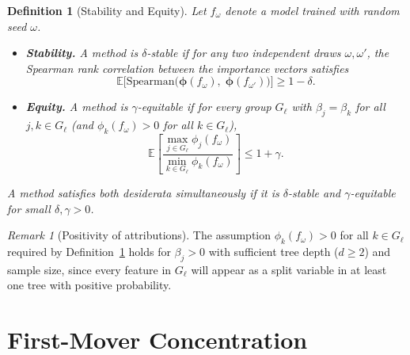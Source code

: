 \documentclass[11pt]{article}
\newtheorem{definition}[theorem]{Definition}
\theoremstyle{remark}
\newtheorem{remark}[theorem]{Remark}
\newcommand{\Gl}{G_\ell}                    %
\newcommand{\phij}{\phi_j}                  %
\newcommand{\phik}{\phi_k}                  %
\newcommand{\Exp}{\mathbb{E}}              %
\begin{document}
\begin{definition}[Stability and Equity]
\label{def:desiderata}
Let $f_\omega$ denote a model trained with random seed $\omega$.
\begin{itemize}
  \item \textbf{Stability.} A method is $\delta$-stable if for any two
    independent draws $\omega, \omega'$, the Spearman rank correlation
    between the importance vectors satisfies
    \begin{equation}
      \Exp\bigl[\mathrm{Spearman}\bigl(
        \boldsymbol{\phi}(f_\omega),\;
        \boldsymbol{\phi}(f_{\omega'})
      \bigr)\bigr] \geq 1 - \delta.
    \end{equation}

  \item \textbf{Equity.} A method is $\gamma$-equitable if for every group
    $\Gl$ with $\beta_j = \beta_k$ for all $j, k \in \Gl$
    (and $\phik(f_\omega) > 0$ for all $k \in \Gl$),
    \begin{equation}
      \Exp\!\left[
        \frac{\max_{j \in \Gl} \phij(f_\omega)}
             {\min_{k \in \Gl} \phik(f_\omega)}
      \right] \leq 1 + \gamma.
    \end{equation}
\end{itemize}
A method satisfies both desiderata simultaneously if it is
$\delta$-stable and $\gamma$-equitable for small $\delta, \gamma > 0$.
\end{definition}

\begin{remark}[Positivity of attributions]
\label{rem:positivity}
The assumption $\phik(f_\omega) > 0$ for all $k \in \Gl$ required by
Definition~\ref{def:desiderata} holds for $\beta_j > 0$ with sufficient
tree depth ($d \geq 2$) and sample size, since every feature in $\Gl$ will
appear as a split variable in at least one tree with positive probability.
\end{remark}


\section{First-Mover Concentration}
\label{sec:first-mover}
\end{document}
